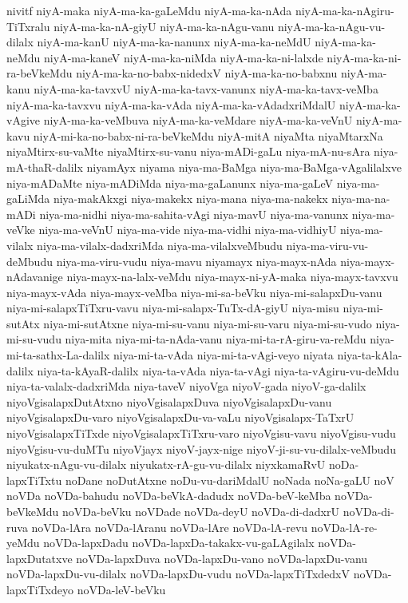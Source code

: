 {nivitf
niyA-maka
niyA-ma-ka-gaLeMdu
niyA-ma-ka-nAda
niyA-ma-ka-nAgiru-TiTxralu
niyA-ma-ka-nA-giyU
niyA-ma-ka-nAgu-vanu
niyA-ma-ka-nAgu-vu-dilalx
niyA-ma-kanU
niyA-ma-ka-nanunx
niyA-ma-ka-neMdU
niyA-ma-ka-neMdu
niyA-ma-kaneV
niyA-ma-ka-niMda
niyA-ma-ka-ni-lalxde
niyA-ma-ka-ni-ra-beVkeMdu
niyA-ma-ka-no-babx-nidedxV
niyA-ma-ka-no-babxnu
niyA-ma-kanu
niyA-ma-ka-tavxvU
niyA-ma-ka-tavx-vanunx
niyA-ma-ka-tavx-veMba
niyA-ma-ka-tavxvu
niyA-ma-ka-vAda
niyA-ma-ka-vAdadxriMdalU
niyA-ma-ka-vAgive
niyA-ma-ka-veMbuva
niyA-ma-ka-veMdare
niyA-ma-ka-veVnU
niyA-ma-kavu
niyA-mi-ka-no-babx-ni-ra-beVkeMdu
niyA-mitA
niyaMta
niyaMtarxNa
niyaMtirx-su-vaMte
niyaMtirx-su-vanu
niya-mADi-gaLu
niya-mA-nu-sAra
niya-mA-thaR-dalilx
niyamAyx
niyama
niya-ma-BaMga
niya-ma-BaMga-vAgalilalxve
niya-mADaMte
niya-mADiMda
niya-ma-gaLanunx
niya-ma-gaLeV
niya-ma-gaLiMda
niya-makAkxgi
niya-makekx
niya-mana
niya-ma-nakekx
niya-ma-na-mADi
niya-ma-nidhi
niya-ma-sahita-vAgi
niya-mavU
niya-ma-vanunx
niya-ma-veVke
niya-ma-veVnU
niya-ma-vide
niya-ma-vidhi
niya-ma-vidhiyU
niya-ma-vilalx
niya-ma-vilalx-dadxriMda
niya-ma-vilalxveMbudu
niya-ma-viru-vu-deMbudu
niya-ma-viru-vudu
niya-mavu
niyamayx
niya-mayx-nAda
niya-mayx-nAdavanige
niya-mayx-na-lalx-veMdu
niya-mayx-ni-yA-maka
niya-mayx-tavxvu
niya-mayx-vAda
niya-mayx-veMba
niya-mi-sa-beVku
niya-mi-salapxDu-vanu
niya-mi-salapxTiTxru-vavu
niya-mi-salapx-TuTx-dA-giyU
niya-misu
niya-mi-sutAtx
niya-mi-sutAtxne
niya-mi-su-vanu
niya-mi-su-varu
niya-mi-su-vudo
niya-mi-su-vudu
niya-mita
niya-mi-ta-nAda-vanu
niya-mi-ta-rA-giru-va-reMdu
niya-mi-ta-sathx-La-dalilx
niya-mi-ta-vAda
niya-mi-ta-vAgi-veyo
niyata
niya-ta-kAla-dalilx
niya-ta-kAyaR-dalilx
niya-ta-vAda
niya-ta-vAgi
niya-ta-vAgiru-vu-deMdu
niya-ta-valalx-dadxriMda
niya-taveV
niyoVga
niyoV-gada
niyoV-ga-dalilx
niyoVgisalapxDutAtxno
niyoVgisalapxDuva
niyoVgisalapxDu-vanu
niyoVgisalapxDu-varo
niyoVgisalapxDu-va-vaLu
niyoVgisalapx-TaTxrU
niyoVgisalapxTiTxde
niyoVgisalapxTiTxru-varo
niyoVgisu-vavu
niyoVgisu-vudu
niyoVgisu-vu-duMTu
niyoVjayx
niyoV-jayx-nige
niyoV-ji-su-vu-dilalx-veMbudu
niyukatx-nAgu-vu-dilalx
niyukatx-rA-gu-vu-dilalx
niyxkamaRvU
noDa-lapxTiTxtu
noDane
noDutAtxne
noDu-vu-dariMdalU
noNada
noNa-gaLU
noV
noVDa
noVDa-bahudu
noVDa-beVkA-dadudx
noVDa-beV-keMba
noVDa-beVkeMdu
noVDa-beVku
noVDade
noVDa-deyU
noVDa-di-dadxrU
noVDa-di-ruva
noVDa-lAra
noVDa-lAranu
noVDa-lAre
noVDa-lA-revu
noVDa-lA-re-yeMdu
noVDa-lapxDadu
noVDa-lapxDa-takakx-vu-gaLAgilalx
noVDa-lapxDutatxve
noVDa-lapxDuva
noVDa-lapxDu-vano
noVDa-lapxDu-vanu
noVDa-lapxDu-vu-dilalx
noVDa-lapxDu-vudu
noVDa-lapxTiTxdedxV
noVDa-lapxTiTxdeyo
noVDa-leV-beVku
}
